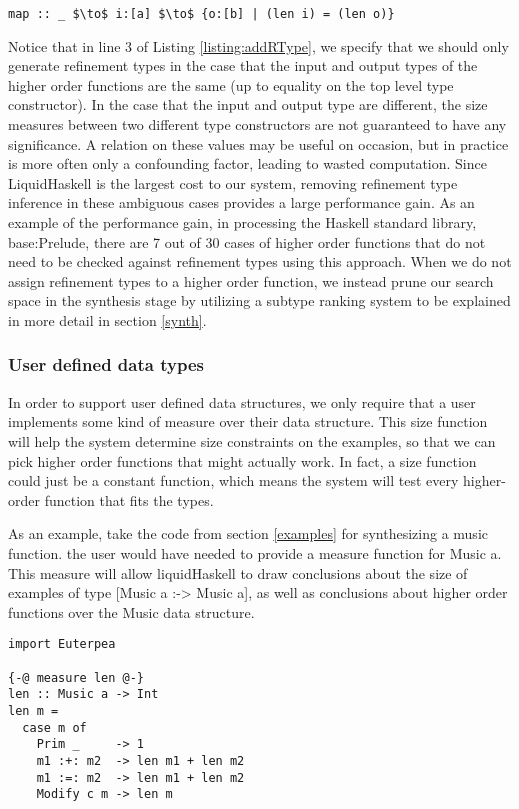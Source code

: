 \begin{lstlisting}[caption=A satisfying refinement type for map]
map :: _ $\to$ i:[a] $\to$ {o:[b] | (len i) = (len o)}
\end{lstlisting}

Notice that in line 3 of Listing \ref{listing:addRType}, we specify that we should only generate refinement types in the case that the input and output types of the higher order functions are the same (up to equality on the top level type constructor).
In the case that the input and output type are different, the size measures between two different type constructors are not guaranteed to have any significance.
A relation on these values may be useful on occasion, but in practice is more often only a confounding factor, leading to wasted computation.
Since LiquidHaskell is the largest cost to our system, removing refinement type inference in these ambiguous cases provides a large performance gain.
As an example of the performance gain, in processing the Haskell standard library, base:Prelude, there are 7 out of 30 cases of higher order functions that do not need to be checked against refinement types using this approach.
When we do not assign refinement types to a higher order function, we instead prune our search space in the synthesis stage by utilizing a subtype ranking system to be explained in more detail in section \ref{synth}.


\subsubsection{User defined data types}
In order to support user defined data structures, we only require that a user implements some kind of measure\cite{realWorldLiquid} over their data structure.
This size function will help the system determine size constraints on the examples, so that we can pick higher order functions that might actually work.
In fact, a size function could just be a constant function, which means the system will test every higher-order function that fits the types. 

As an example, take the code from section \ref{examples} for synthesizing a music function.
the user would have needed to provide a measure function for Music a.
This measure will allow liquidHaskell to draw conclusions about the size of examples of type [Music a :-> Music a], as well as conclusions about higher order functions over the Music data structure.

\begin{lstlisting}
import Euterpea

{-@ measure len @-}
len :: Music a -> Int
len m =
  case m of
    Prim _     -> 1
    m1 :+: m2  -> len m1 + len m2
    m1 :=: m2  -> len m1 + len m2
    Modify c m -> len m
\end{lstlisting}



